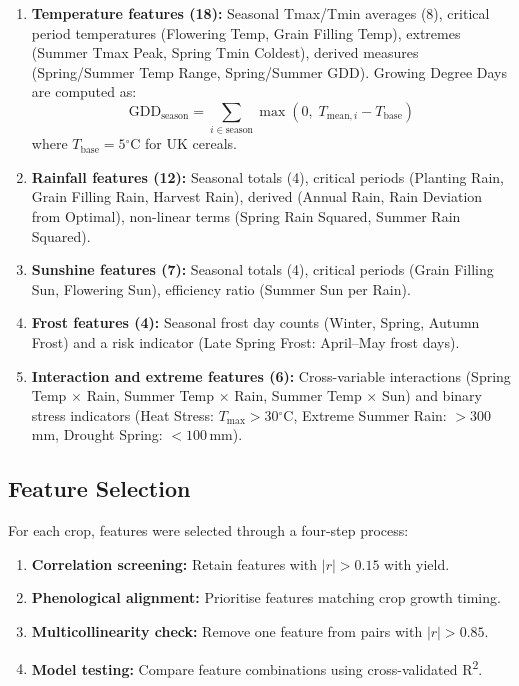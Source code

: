 \documentclass[12pt,a4paper]{report}
\newcommand{\rsq}{R\textsuperscript{2}}
\newcommand{\degrees}{$^{\circ}$C}
\begin{document}
\begin{enumerate}
    \item \textbf{Temperature features (18):} Seasonal Tmax/Tmin averages (8), critical period temperatures (Flowering Temp, Grain Filling Temp), extremes (Summer Tmax Peak, Spring Tmin Coldest), derived measures (Spring/Summer Temp Range, Spring/Summer GDD). Growing Degree Days are computed as:
    \begin{equation}
        \text{GDD}_{\text{season}} = \sum_{i \in \text{season}} \max(0,\; T_{\text{mean},i} - T_{\text{base}})
    \end{equation}
    where $T_{\text{base}} = 5$\degrees{} for UK cereals.

    \item \textbf{Rainfall features (12):} Seasonal totals (4), critical periods (Planting Rain, Grain Filling Rain, Harvest Rain), derived (Annual Rain, Rain Deviation from Optimal), non-linear terms (Spring Rain Squared, Summer Rain Squared).

    \item \textbf{Sunshine features (7):} Seasonal totals (4), critical periods (Grain Filling Sun, Flowering Sun), efficiency ratio (Summer Sun per Rain).

    \item \textbf{Frost features (4):} Seasonal frost day counts (Winter, Spring, Autumn Frost) and a risk indicator (Late Spring Frost: April--May frost days).

    \item \textbf{Interaction and extreme features (6):} Cross-variable interactions (Spring Temp $\times$ Rain, Summer Temp $\times$ Rain, Summer Temp $\times$ Sun) and binary stress indicators (Heat Stress: $T_{\max} > 30$\degrees{}, Extreme Summer Rain: $> 300$\,mm, Drought Spring: $< 100$\,mm).
\end{enumerate}

\subsection{Feature Selection}

For each crop, features were selected through a four-step process:
\begin{enumerate}
    \item \textbf{Correlation screening:} Retain features with $|r| > 0.15$ with yield.
    \item \textbf{Phenological alignment:} Prioritise features matching crop growth timing.
    \item \textbf{Multicollinearity check:} Remove one feature from pairs with $|r| > 0.85$.
    \item \textbf{Model testing:} Compare feature combinations using cross-validated \rsq{}.
\end{enumerate}
\end{document}
